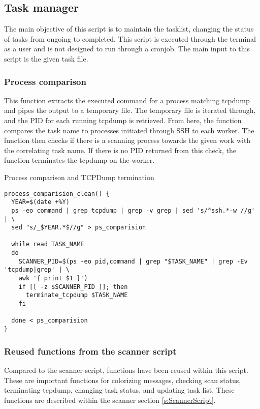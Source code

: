 \subsection{Task manager}
\label{ss:Cleanup}

The main objective of this script is to maintain the tasklist, changing the status of tasks from ongoing to completed.
This script is executed through the terminal as a user and is not designed to run through a cronjob.
The main input to this script is the given task file.

\subsubsection{Process comparison}
This function extracts the executed command for a process matching tcpdump and pipes the output to a temporary file.
The temporary file is iterated through, and the PID for each running tcpdump is retrieved.
From here, the function compares the task name to processes initiated through SSH to each worker.
The function then checks if there is a scanning process towards the given work with the correlating task name.
If there is no PID returned from this check, the function terminates the tcpdump on the worker.

\begin{listing}[!ht]
\caption{Process comparison and TCPDump termination}
\label{lst:ProcessCompare}
\begin{verbatim}
process_comparision_clean() {
  YEAR=$(date +%Y)
  ps -eo command | grep tcpdump | grep -v grep | sed 's/^ssh.*-w //g' | \
  sed "s/_$YEAR.*$//g" > ps_comparision

  while read TASK_NAME
  do
    SCANNER_PID=$(ps -eo pid,command | grep "$TASK_NAME" | grep -Ev 'tcpdump|grep' | \
    awk '{ print $1 }')
    if [[ -z $SCANNER_PID ]]; then
      terminate_tcpdump $TASK_NAME
    fi

  done < ps_comparision
}
\end{verbatim}
\end{listing}


\subsubsection{Reused functions from the scanner script}
\label{ss:ReusedFunctionsScannerScript}
Compared to the scanner script, functions have been reused within this script.
These are important functions for colorizing messages, checking scan status, terminating tcpdump, changing task status, and updating task list.
These functions are described within the scanner section \ref{s:ScannerScript}.


